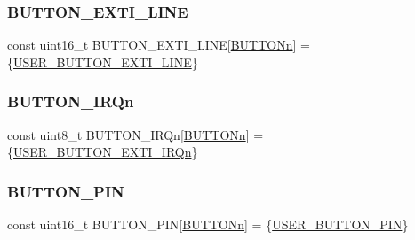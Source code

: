 \subsubsection{\texorpdfstring{BUTTON\_EXTI\_LINE}{BUTTON\_EXTI\_LINE}}
{\footnotesize\ttfamily const uint16\+\_\+t B\+U\+T\+T\+O\+N\+\_\+\+E\+X\+T\+I\+\_\+\+L\+I\+NE\mbox{[}\mbox{\hyperlink{group___s_t_m32_f1_x_x___n_u_c_l_e_o___l_o_w___l_e_v_e_l___b_u_t_t_o_n_ga43d47e509ada64329393005c3be15d64}{B\+U\+T\+T\+O\+Nn}}\mbox{]} = \{\mbox{\hyperlink{group___s_t_m32_f1_x_x___n_u_c_l_e_o___l_o_w___l_e_v_e_l___b_u_t_t_o_n_gac41d04c2244ba780e4749991c85d1e9a}{U\+S\+E\+R\+\_\+\+B\+U\+T\+T\+O\+N\+\_\+\+E\+X\+T\+I\+\_\+\+L\+I\+NE}}\}}

\mbox{\label{group___s_t_m32_f1_x_x___n_u_c_l_e_o___l_o_w___l_e_v_e_l___private___variables_ga13c3e27c584df9fccc4697dd535ea1cd}} 
\subsubsection{\texorpdfstring{BUTTON\_IRQn}{BUTTON\_IRQn}}
{\footnotesize\ttfamily const uint8\+\_\+t B\+U\+T\+T\+O\+N\+\_\+\+I\+R\+Qn\mbox{[}\mbox{\hyperlink{group___s_t_m32_f1_x_x___n_u_c_l_e_o___l_o_w___l_e_v_e_l___b_u_t_t_o_n_ga43d47e509ada64329393005c3be15d64}{B\+U\+T\+T\+O\+Nn}}\mbox{]} = \{\mbox{\hyperlink{group___s_t_m32_f1_x_x___n_u_c_l_e_o___l_o_w___l_e_v_e_l___b_u_t_t_o_n_ga2e6e65a053529869d1c370610825d98f}{U\+S\+E\+R\+\_\+\+B\+U\+T\+T\+O\+N\+\_\+\+E\+X\+T\+I\+\_\+\+I\+R\+Qn}}\}}

\mbox{\label{group___s_t_m32_f1_x_x___n_u_c_l_e_o___l_o_w___l_e_v_e_l___private___variables_gadf78f2d71408a01f8d30929c2d2da82b}} 
\subsubsection{\texorpdfstring{BUTTON\_PIN}{BUTTON\_PIN}}
{\footnotesize\ttfamily const uint16\+\_\+t B\+U\+T\+T\+O\+N\+\_\+\+P\+IN\mbox{[}\mbox{\hyperlink{group___s_t_m32_f1_x_x___n_u_c_l_e_o___l_o_w___l_e_v_e_l___b_u_t_t_o_n_ga43d47e509ada64329393005c3be15d64}{B\+U\+T\+T\+O\+Nn}}\mbox{]} = \{\mbox{\hyperlink{group___s_t_m32_f1_x_x___n_u_c_l_e_o___l_o_w___l_e_v_e_l___b_u_t_t_o_n_ga34df6915e3013d6a0c74131d3946b659}{U\+S\+E\+R\+\_\+\+B\+U\+T\+T\+O\+N\+\_\+\+P\+IN}}\}}

